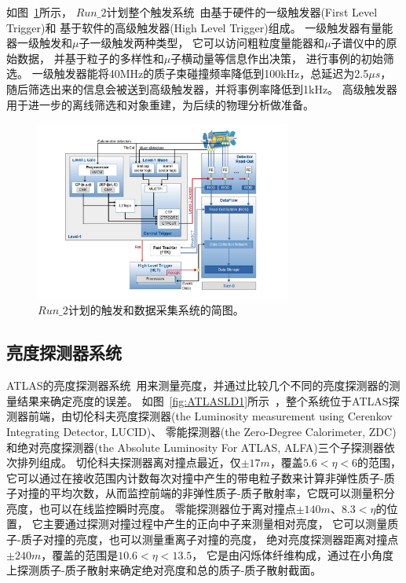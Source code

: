 如图~\ref{fig:ATLASTS1}所示，
$Run\_2$计划整个触发系统~\cite{ATLASRTS}由基于硬件的一级触发器(First Level Trigger)和
基于软件的高级触发器(High Level Trigger)组成。
一级触发器有量能器一级触发和$\mu$子一级触发两种类型，
它可以访问粗粒度量能器和$\mu$子谱仪中的原始数据，
并基于粒子的多样性和$\mu$子横动量等信息作出决策，
进行事例的初始筛选。
一级触发器能将40MHz的质子束碰撞频率降低到100kHz，总延迟为2.5$\mu s$，
随后筛选出来的信息会被送到高级触发器，并将事例率降低到1kHz。
高级触发器用于进一步的离线筛选和对象重建，为后续的物理分析做准备。

\begin{figure}
  \begin{center}
    \includegraphics[width=0.75\textwidth]{figuresEXP/ATLASTS1.jpg}
  \end{center}
  \caption{
$Run\_2$计划的触发和数据采集系统的简图。
  }
    \label{fig:ATLASTS1}
\end{figure}

\subsection{亮度探测器系统}
\label{sec:ATLASLD}

ATLAS的亮度探测器系统~\cite{ATLASLUMID}用来测量亮度，并通过比较几个不同的亮度探测器的测量结果来确定亮度的误差。
如图~\ref{fig:ATLASLD1}所示~\cite{LDIm}，整个系统位于ATLAS探测器前端，由切伦科夫亮度探测器(the Luminosity measurement using Cerenkov Integrating Detector, LUCID)、
零能探测器(the Zero-Degree Calorimeter, ZDC)和绝对亮度探测器(the Absolute Luminosity For ATLAS, ALFA)三个子探测器依次排列组成。
切伦科夫探测器离对撞点最近，仅$\pm 17m$，覆盖$5.6<\eta<6$的范围，
它可以通过在接收范围内计数每次对撞中产生的带电粒子数来计算非弹性质子-质子对撞的平均次数，从而监控前端的非弹性质子-质子散射率，它既可以测量积分亮度，也可以在线监控瞬时亮度。
零能探测器位于离对撞点$\pm 140m$、$8.3<\eta$的位置，
它主要通过探测对撞过程中产生的正向中子来测量相对亮度，
它可以测量质子-质子对撞的亮度，也可以测量重离子对撞的亮度，
绝对亮度探测器距离对撞点$\pm 240m$，覆盖的范围是$10.6<\eta<13.5$，
它是由闪烁体纤维构成，通过在小角度上探测质子-质子散射来确定绝对亮度和总的质子-质子散射截面。

